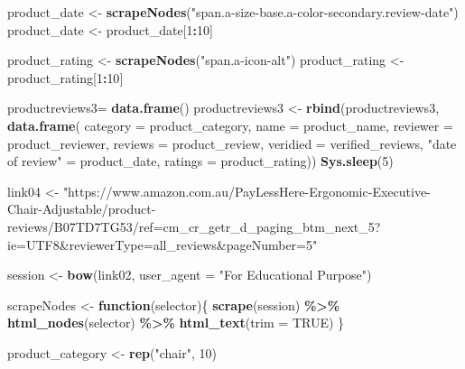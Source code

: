 \documentclass[
]{article}
\newenvironment{Shaded}{\begin{snugshade}}{\end{snugshade}}
\newcommand{\AttributeTok}[1]{\textcolor[rgb]{0.13,0.29,0.53}{#1}}
\newcommand{\ConstantTok}[1]{\textcolor[rgb]{0.56,0.35,0.01}{#1}}
\newcommand{\ControlFlowTok}[1]{\textcolor[rgb]{0.13,0.29,0.53}{\textbf{#1}}}
\newcommand{\DecValTok}[1]{\textcolor[rgb]{0.00,0.00,0.81}{#1}}
\newcommand{\FunctionTok}[1]{\textcolor[rgb]{0.13,0.29,0.53}{\textbf{#1}}}
\newcommand{\NormalTok}[1]{#1}
\newcommand{\OtherTok}[1]{\textcolor[rgb]{0.56,0.35,0.01}{#1}}
\newcommand{\SpecialCharTok}[1]{\textcolor[rgb]{0.81,0.36,0.00}{\textbf{#1}}}
\newcommand{\StringTok}[1]{\textcolor[rgb]{0.31,0.60,0.02}{#1}}
\begin{document}
\begin{Shaded}
\begin{Highlighting}[]
\NormalTok{  product\_date }\OtherTok{\textless{}{-}} \FunctionTok{scrapeNodes}\NormalTok{(}\StringTok{"span.a{-}size{-}base.a{-}color{-}secondary.review{-}date"}\NormalTok{)}
\NormalTok{  product\_date }\OtherTok{\textless{}{-}}\NormalTok{ product\_date[}\DecValTok{1}\SpecialCharTok{:}\DecValTok{10}\NormalTok{]}
  
\NormalTok{  product\_rating }\OtherTok{\textless{}{-}} \FunctionTok{scrapeNodes}\NormalTok{(}\StringTok{"span.a{-}icon{-}alt"}\NormalTok{)}
\NormalTok{  product\_rating }\OtherTok{\textless{}{-}}\NormalTok{ product\_rating[}\DecValTok{1}\SpecialCharTok{:}\DecValTok{10}\NormalTok{]}
  
\NormalTok{  productreviews3}\OtherTok{=} \FunctionTok{data.frame}\NormalTok{()}
\NormalTok{  productreviews3 }\OtherTok{\textless{}{-}} \FunctionTok{rbind}\NormalTok{(productreviews3, }\FunctionTok{data.frame}\NormalTok{(}
                      \AttributeTok{category =}\NormalTok{ product\_category,}
                      \AttributeTok{name =}\NormalTok{ product\_name,}
                      \AttributeTok{reviewer =}\NormalTok{ product\_reviewer,}
                      \AttributeTok{reviews =}\NormalTok{ product\_review,}
                      \AttributeTok{veridied =}\NormalTok{ verified\_reviews,}
                      \StringTok{"date of review"} \OtherTok{=}\NormalTok{ product\_date,}
                      \AttributeTok{ratings =}\NormalTok{ product\_rating))}
  \FunctionTok{Sys.sleep}\NormalTok{(}\DecValTok{5}\NormalTok{)}
  
\NormalTok{  link04 }\OtherTok{\textless{}{-}} \StringTok{"https://www.amazon.com.au/PayLessHere{-}Ergonomic{-}Executive{-}Chair{-}Adjustable/product{-}reviews/B07TD7TG53/ref=cm\_cr\_getr\_d\_paging\_btm\_next\_5?ie=UTF8\&reviewerType=all\_reviews\&pageNumber=5"}


\NormalTok{  session }\OtherTok{\textless{}{-}} \FunctionTok{bow}\NormalTok{(link02,}
               \AttributeTok{user\_agent =} \StringTok{"For Educational Purpose"}\NormalTok{)}

\NormalTok{  scrapeNodes }\OtherTok{\textless{}{-}} \ControlFlowTok{function}\NormalTok{(selector)\{}
    \FunctionTok{scrape}\NormalTok{(session) }\SpecialCharTok{\%\textgreater{}\%}
      \FunctionTok{html\_nodes}\NormalTok{(selector) }\SpecialCharTok{\%\textgreater{}\%}
      \FunctionTok{html\_text}\NormalTok{(}\AttributeTok{trim =} \ConstantTok{TRUE}\NormalTok{)}
\NormalTok{  \}}

\NormalTok{  product\_category }\OtherTok{\textless{}{-}} \FunctionTok{rep}\NormalTok{(}\StringTok{"chair"}\NormalTok{, }\DecValTok{10}\NormalTok{)}
  

\end{Highlighting}
\end{Shaded}
\end{document}
